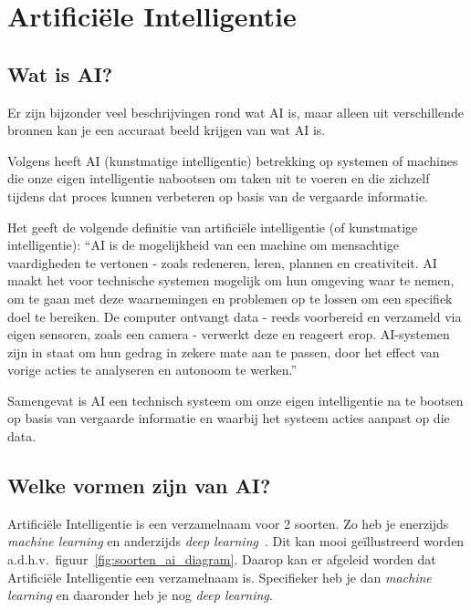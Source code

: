 \section{Artificiële Intelligentie}
\subsection{Wat is AI?}
Er zijn bijzonder veel beschrijvingen rond wat AI is, maar alleen uit verschillende bronnen kan je een accuraat beeld krijgen van wat AI is.

Volgens \textcite{Oracle2014} heeft AI (kunstmatige intelligentie) betrekking op systemen of machines die onze eigen intelligentie nabootsen om taken uit te voeren en die zichzelf tijdens dat proces kunnen verbeteren op basis van de vergaarde informatie.

Het \textcite{EuropeesParlement2020} geeft de volgende definitie van artificiële intelligentie (of kunstmatige intelligentie): ``AI is de mogelijkheid van een machine om mensachtige vaardigheden te vertonen - zoals redeneren, leren, plannen en creativiteit.
AI maakt het voor technische systemen mogelijk om hun omgeving waar te nemen, om te gaan met deze waarnemingen en problemen op te lossen om een specifiek doel te bereiken. De computer ontvangt data - reeds voorbereid en verzameld via eigen sensoren, zoals een camera - verwerkt deze en reageert erop.
AI-systemen zijn in staat om hun gedrag in zekere mate aan te passen, door het effect van vorige acties te analyseren en autonoom te werken.''

Samengevat is AI een technisch systeem om onze eigen intelligentie na te bootsen op basis van vergaarde informatie en waarbij het systeem acties aanpast op die data.

\subsection{Welke vormen zijn van AI?}
Artificiële Intelligentie is een verzamelnaam voor 2 soorten. Zo heb je enerzijds \textit{machine learning} en anderzijds \textit{deep learning}~\autocite{Kavlakoglu2020}.
Dit kan mooi geïllustreerd worden a.d.h.v.\ figuur~\ref{fig:soorten_ai_diagram}. Daarop kan er afgeleid worden dat Artificiële Intelligentie een verzamelnaam is. Specifieker heb je dan \textit{machine learning} en daaronder heb je nog \textit{deep learning}.

